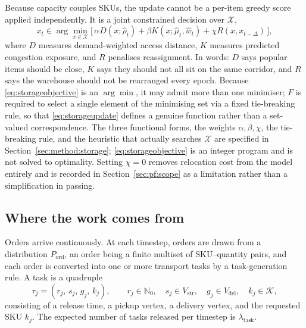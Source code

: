\documentclass[../main.tex]{subfiles}
\begin{document}
Because capacity couples SKUs, the update cannot be a per-item greedy score
applied independently. It is a joint constrained decision over $\mathcal{X}$,
\begin{equation}
  x_t \in \arg\min_{x \in \mathcal{X}}
    \bigl[\, \alpha D(x; \hat{\rho}_t)
       + \beta K(x; \hat{\mu}_t, \hat{w}_t)
       + \chi R(x, x_{t-\Delta}) \,\bigr],
  \label{eq:storageobjective}
\end{equation}
where $D$ measures demand-weighted access distance, $K$ measures predicted
congestion exposure, and $R$ penalises reassignment. In words: $D$ says popular
items should be close, $K$ says they should not all sit on the same corridor, and
$R$ says the warehouse should not be rearranged every epoch. Because
\eqref{eq:storageobjective} is an $\arg\min$, it may admit more than one %
minimiser; $F$ is required to select a single element of the minimising set via a
fixed tie-breaking rule, so that \eqref{eq:storageupdate} defines a genuine
function rather than a set-valued correspondence. The three functional forms, the
weights $\alpha, \beta, \chi$, the tie-breaking rule, and the heuristic that
actually searches $\mathcal{X}$ are specified in Section~\ref{sec:method:storage};
\eqref{eq:storageobjective} is an integer program and is not solved to
optimality. Setting $\chi = 0$ removes relocation cost from the model entirely
and is recorded in Section~\ref{sec:pf:scope} as a limitation rather than a
simplification in passing.

\subsection{Where the work comes from}
\label{sec:pf:tasks}

Orders arrive continuously. At each timestep, orders are drawn from a
distribution $P_{\mathrm{ord}}$, an order being a finite multiset of
SKU--quantity pairs, and each order is converted into one or more transport tasks
by a task-generation rule. A task is a quadruple %
\begin{equation}
  \tau_j = (r_j,\, s_j,\, g_j,\, k_j), \qquad
  r_j \in \mathbb{N}_0,\quad s_j \in V_{\mathrm{str}},\quad
  g_j \in V_{\mathrm{del}}, \quad k_j \in \mathcal{K},
  \label{eq:task}
\end{equation}
consisting of a release time, a pickup vertex, a delivery vertex, and the
requested SKU $k_j$. The expected number of tasks released per timestep is
$\lambda_{\mathrm{task}}$.
\end{document}
